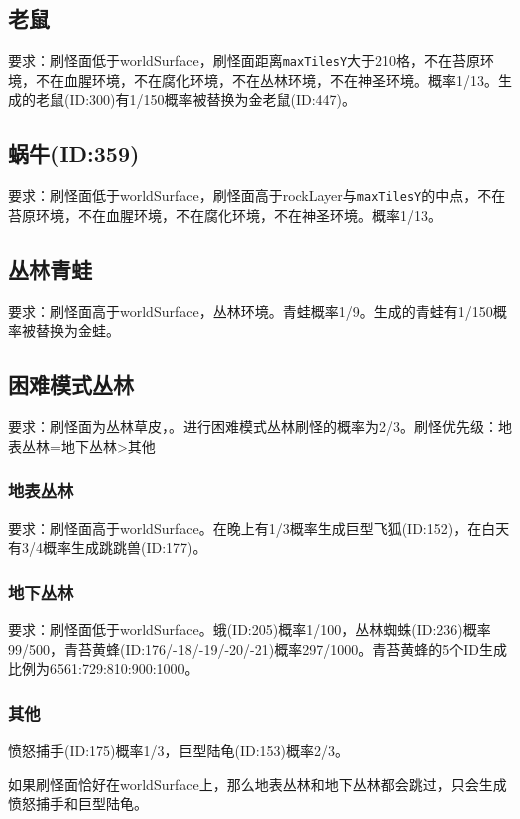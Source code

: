 \subsection{老鼠}
要求：刷怪面低于worldSurface，刷怪面距离\lstinline{maxTilesY}大于210格，不在苔原环境，不在血腥环境，不在腐化环境，不在丛林环境，不在神圣环境。概率1/13。生成的老鼠(ID:300)有1/150概率被替换为金老鼠(ID:447)。

\subsection{蜗牛(ID:359)}
要求：刷怪面低于worldSurface，刷怪面高于rockLayer与\lstinline{maxTilesY}的中点，不在苔原环境，不在血腥环境，不在腐化环境，不在神圣环境。概率1/13。

\subsection{丛林青蛙}
要求：刷怪面高于worldSurface，丛林环境。青蛙概率1/9。生成的青蛙有1/150概率被替换为金蛙。

\subsection{困难模式丛林}
要求：刷怪面为丛林草皮，。进行困难模式丛林刷怪的概率为2/3。刷怪优先级：地表丛林=地下丛林>其他

\subsubsection{地表丛林}
要求：刷怪面高于worldSurface。在晚上有1/3概率生成巨型飞狐(ID:152)，在白天有3/4概率生成跳跳兽(ID:177)。

\subsubsection{地下丛林}
要求：刷怪面低于worldSurface。蛾(ID:205)概率1/100，丛林蜘蛛(ID:236)概率99/500，青苔黄蜂(ID:176/-18/-19/-20/-21)概率297/1000。青苔黄蜂的5个ID生成比例为6561:729:810:900:1000。

\subsubsection{其他}
愤怒捕手(ID:175)概率1/3，巨型陆龟(ID:153)概率2/3。

\begin{remark}
如果刷怪面恰好在worldSurface上，那么地表丛林和地下丛林都会跳过，只会生成愤怒捕手和巨型陆龟。
\end{remark}

